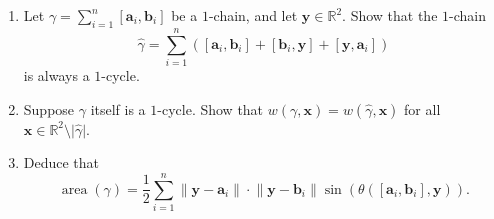 \documentclass[12 pt, letterpaper]{hmcpset}
\begin{document}
\pagebreak

\begin{problem}[8.]
	\begin{enumerate}
		\item Let $\gamma = \sum_{i = 1}^{n} [\mathbf{a}_{i}, \mathbf{b}_{i}]$ be a $1$-chain, and let $\mathbf{y} \in \mathbb{R}^{2}$. Show that the $1$-chain
			\[
				\hat{\gamma} = \sum_{i = 1}^{n} ([\mathbf{a}_{i}, \mathbf{b}_{i}] + [\mathbf{b}_{i}, \mathbf{y}] + [\mathbf{y}, \mathbf{a}_{i}])
			\]
			is always a $1$-cycle.
		\item Suppose $\gamma$ itself is a $1$-cycle. Show that $w(\gamma, \mathbf{x}) = w(\hat{\gamma}, \mathbf{x})$ for all $\mathbf{x} \in \mathbb{R}^{2} \setminus \lvert \hat{\gamma} \rvert$.
		\item Deduce that
			\[
				\operatorname{area}(\gamma) = \frac{1}{2} \sum_{i = 1}^{n}  \lVert \mathbf{y} - \mathbf{a}_{i} \rVert \cdot \lVert \mathbf{y} - \mathbf{b}_{i} \rVert \sin{(\theta([\mathbf{a}_{i}, \mathbf{b}_{i}], \mathbf{y}))}.
			\]
	\end{enumerate}
\end{problem}
\end{document}
